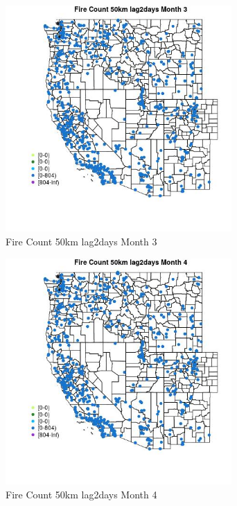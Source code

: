 \begin{figure} 
\centering  
\includegraphics[width=0.77\textwidth]{Code_Outputs/Report_ML_input_PM25_Step4_part_f_de_duplicated_aveswNAs_MapObsMo3Fire_Count_50km_lag2days.jpg} 
\caption{\label{fig:Report_ML_input_PM25_Step4_part_f_de_duplicated_aveswNAsMapObsMo3Fire_Count_50km_lag2days}Fire Count 50km lag2days Month 3} 
\end{figure} 
 

\begin{figure} 
\centering  
\includegraphics[width=0.77\textwidth]{Code_Outputs/Report_ML_input_PM25_Step4_part_f_de_duplicated_aveswNAs_MapObsMo4Fire_Count_50km_lag2days.jpg} 
\caption{\label{fig:Report_ML_input_PM25_Step4_part_f_de_duplicated_aveswNAsMapObsMo4Fire_Count_50km_lag2days}Fire Count 50km lag2days Month 4} 
\end{figure} 
 

